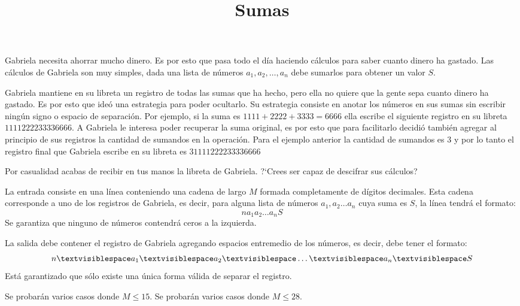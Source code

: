 \documentclass{oci}
\title{Sumas}
\begin{document}
\begin{problemDescription}
Gabriela necesita ahorrar mucho dinero.
Es por esto que pasa todo el día haciendo cálculos para saber cuanto dinero
ha gastado.
Las cálculos de Gabriela son muy simples, dada una lista de números $a_1, a_2,
\dots, a_n$ debe sumarlos para obtener un valor $S$.

Gabriela mantiene en su libreta un registro de todas las sumas que ha hecho,
pero ella no quiere que la gente sepa cuanto dinero ha gastado.
Es por esto que ideó una estrategia para poder ocultarlo.
Su estrategia consiste en anotar los números en sus sumas sin escribir
ningún signo o espacio de separación.
Por ejemplo, si la suma es $1111+2222+3333=6666$ ella escribe el siguiente
registro en su libreta $1111222233336666$.
A Gabriela le interesa poder recuperar la suma original, es por esto que
para facilitarlo decidió también agregar al principio de sus registros la
cantidad de sumandos en la operación.
Para el ejemplo anterior la cantidad de sumandos es $3$ y por lo tanto el
registro final que Gabriela escribe en su libreta es $31111222233336666$

Por casualidad acabas de recibir en tus manos la libreta de Gabriela.
?`Crees ser capaz de descifrar sus cálculos?
\end{problemDescription}

\begin{inputDescription}
La entrada consiste en una línea conteniendo una cadena de largo $M$ formada
completamente de dígitos decimales.
Esta cadena corresponde a uno de los registros de Gabriela, es decir, para
alguna lista de números $a_1,a_2\dots a_n$ cuya suma es $S$, la línea tendrá el
formato:
$$n a_1 a_2 \dots a_nS$$
Se garantiza que ninguno de números contendrá ceros a la izquierda.
\end{inputDescription}

\begin{outputDescription}
La salida debe contener el registro de Gabriela agregando espacios 
entremedio de los números, es decir, debe tener el formato:
$$n\textvisiblespace a_1\textvisiblespace a_2\textvisiblespace
\dots\textvisiblespace a_n\textvisiblespace S$$
Está garantizado que sólo existe una única forma válida de separar el registro.
\end{outputDescription}

\begin{scoreDescription}
   Se probarán varios casos donde $M\leq 15$.
   Se probarán varios casos donde $M\leq 28$.
\end{scoreDescription}

\begin{sampleDescription}
\end{sampleDescription}
\end{document}

